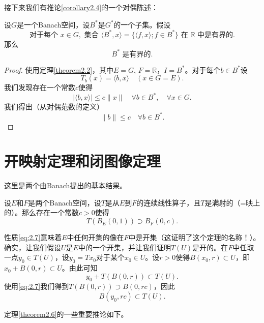 接下来我们有推论\ref{corollary2.4}的一个对偶陈述：

\begin{corollary}\label{corollary2.5}
设$G$是一个Banach空间，设$B^*$是$G^*$的一个子集。假设
\begin{equation}
\text{对于每个 } x \in G, \text{ 集合 } \langle B^*, x \rangle = \{\langle f, x \rangle; f \in B^*\} \text{ 在 } \mathbb{R} \text{ 中是有界的}. \label{eq:2.5}
\end{equation}
那么
\begin{equation}
B^* \text{ 是有界的}. \label{eq:2.6}
\end{equation}
\end{corollary}

\begin{proof}
使用定理\ref{theorem2.2}，其中$E=G$, $F=\mathbb{R}$，$I=B^*$。对于每个$b \in B^*$设
\[
T_b(x) = \langle b, x \rangle \quad (x \in G=E).
\]
我们发现存在一个常数$c$使得
\[
|\langle b, x \rangle| \leq c\|x\| \quad \forall b \in B^*, \quad \forall x \in G.
\]
我们得出（从对偶范数的定义）
\[
\|b\| \leq c \quad \forall b \in B^*.
\]
\end{proof}

\section{开映射定理和闭图像定理}

这里是两个由Banach提出的基本结果。

\begin{theorem}[开映射定理]\label{theorem2.6}
设$E$和$F$是两个Banach空间，设$T$是从$E$到$F$的连续线性算子，且$T$是满射的（=映上的）。那么存在一个常数$c>0$使得
\begin{equation}
T(B_E(0,1)) \supset B_F(0,c). \label{eq:2.7}
\end{equation}
\end{theorem}

\begin{remark}
性质\eqref{eq:2.7}意味着$E$中任何开集的像在$F$中是开集（这证明了这个定理的名称！）。确实，让我们假设$U$是$E$中的一个开集，并让我们证明$T(U)$是开的。在$F$中任取一点$y_0 \in T(U)$，设$y_0=Tx_0$对于某个$x_0 \in U$。设$r>0$使得$B(x_0, r) \subset U$，即$x_0+B(0,r) \subset U$。由此可知
\[
y_0 + T(B(0,r)) \subset T(U).
\]
使用\eqref{eq:2.7}我们得到$T(B(0,r)) \supset B(0, rc)$，因此
\[
B(y_0, rc) \subset T(U).
\]
\end{remark}

定理\ref{theorem2.6}的一些重要推论如下。

